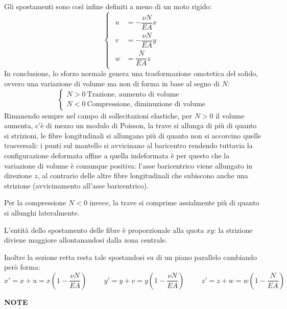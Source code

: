 \documentclass{article}
\begin{document}
\begin{adjustwidth}{2in}{}
	Gli spostamenti sono così infine definiti a meno di un moto rigido:
	 \[
	\boxed{	\begin{cases}
		\begin{aligned}
			u & = -\dfrac{\nu N}{EA}x  \\
			v & = -\dfrac{\nu N}{EA}y  \\
			w & = \dfrac{N}{EA}z 
		\end{aligned}
	\end{cases}}
\] 
	In conclusione, lo sforzo normale genera una trasformazione omotetica del solido, ovvero una variazione di volume ma non di forma in base al segno di $N$:
	\[ \begin{cases}
		N>0 ~ \text{Trazione, aumento di volume} \\
		N<0 ~ \text{Compressione, diminuzione di volume}
	\end{cases}
	\]
	Rimanendo sempre nel campo di sollecitazioni elastiche,
	per $ N>0 $ il volume aumenta, c'è di mezzo un modulo di Poisson, la trave si allunga di più di quanto si strizioni, le fibre longitudinali si allungano più di quanto non si
	accorcino quelle trasversali: i punti sul mantello si avvicinano al baricentro rendendo tuttavia la configurazione deformata affine a quella indeformata è per questo che la variazione di volume è comunque positiva: l’asse baricentrico viene allungato in direzione $ z $, al contrario delle altre fibre longitudinali che subiscono
	anche una strizione (avvicinamento all’asse baricentrico).
	
	Per la compressione $ N<0 $ invece, la trave si comprime assialmente più di quanto si allunghi lateralmente. \newline
	
	L'entità dello spostamento delle fibre è proporzionale alla quota $xy$: la strizione diviene maggiore allontanandosi dalla zona centrale. \newline
	
	Inoltre la sezione retta resta tale spostandosi su di un piano parallelo cambiando però forma:
	\[ x' = x + u = x \left(1-\dfrac{\nu N}{EA}\right) \hspace{1cm } y' = y + v = y \left(1-\dfrac{\nu N}{EA}\right) \hspace{1cm } z' = z + w = w \left(1-\dfrac{ N}{EA}\right)\]
	
	\newpage
	\textbf{{\LARGE NOTE}}
	
\end{adjustwidth}
\end{document}
